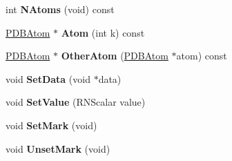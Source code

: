 \begin{DoxyCompactItemize}
\item 
int {\bfseries N\+Atoms} (void) const \hypertarget{class_p_d_b_bond_a0a541777cddea205927604b8fb7c472f}{}\label{class_p_d_b_bond_a0a541777cddea205927604b8fb7c472f}

\item 
\hyperlink{class_p_d_b_atom}{P\+D\+B\+Atom} $\ast$ {\bfseries Atom} (int k) const \hypertarget{class_p_d_b_bond_a99ae9044d8ccef62ae8bf842b4d71089}{}\label{class_p_d_b_bond_a99ae9044d8ccef62ae8bf842b4d71089}

\item 
\hyperlink{class_p_d_b_atom}{P\+D\+B\+Atom} $\ast$ {\bfseries Other\+Atom} (\hyperlink{class_p_d_b_atom}{P\+D\+B\+Atom} $\ast$atom) const \hypertarget{class_p_d_b_bond_ad81a9915251c0459b8c36f23fbc498a6}{}\label{class_p_d_b_bond_ad81a9915251c0459b8c36f23fbc498a6}

\item 
void {\bfseries Set\+Data} (void $\ast$data)\hypertarget{class_p_d_b_bond_ab90e78d84abdbdccea52701cd72212eb}{}\label{class_p_d_b_bond_ab90e78d84abdbdccea52701cd72212eb}

\item 
void {\bfseries Set\+Value} (R\+N\+Scalar value)\hypertarget{class_p_d_b_bond_afc276c92fe706b33151e6ca6e2b7efdb}{}\label{class_p_d_b_bond_afc276c92fe706b33151e6ca6e2b7efdb}

\item 
void {\bfseries Set\+Mark} (void)\hypertarget{class_p_d_b_bond_a2ddf5f506a8dd9d4627e9229303c1683}{}\label{class_p_d_b_bond_a2ddf5f506a8dd9d4627e9229303c1683}

\item 
void {\bfseries Unset\+Mark} (void)\hypertarget{class_p_d_b_bond_a3035fb5fe211a0aa414c376ae457a2f9}{}\label{class_p_d_b_bond_a3035fb5fe211a0aa414c376ae457a2f9}

\end{DoxyCompactItemize}
